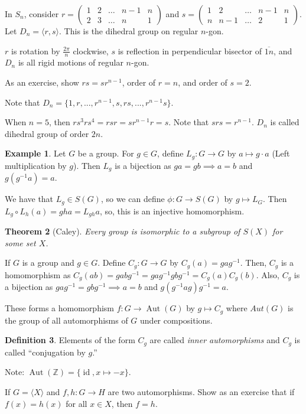 \documentclass{amsart}
\newtheorem{thm}{Theorem}[section]
\theoremstyle{definition}
\newtheorem{definition}[thm]{Definition}
\newtheorem{example}[thm]{Example}
\newcommand{\Z}{\mathbb Z}
\DeclareMathOperator{\id}{id}
\DeclareMathOperator{\Aut}{Aut}
\begin{document}
In $S_n$, consider $r=\begin{pmatrix}
	1&2&\dots&n-1&n\\
	2&3&\dots&n&1
\end{pmatrix}$ and $s=\begin{pmatrix}
	1&2&\dots&n-1&n\\
	n&n-1&\dots&2&1
\end{pmatrix}$. Let $D_n=\langle r,s\rangle$. This is the dihedral group on regular $n$-gon.

$r$ is rotation by $\frac{2\pi}{n}$ clockwise, $s$ is reflection in perpendicular bisector of $\overline{1n}$, and $D_n$ is all rigid motions of regular $n$-gon.

As an exercise, show $rs=sr^{n-1}$, order of $r=n$, and order of $s=2$.

Note that $D_n=\{1,r,...,r^{n-1},s,rs,...,r^{n-1}s\}$.

When $n=5$, then $rs^3rs^4=rsr=sr^{n-1}r=s$. Note that $srs=r^{n-1}$. $D_n$ is called dihedral group of order $2n$.

\begin{example}
	Let $G$ be a group. For $g\in G$, define $L_g:G\to G$ by $a\mapsto g\cdot a$ (Left multiplication by $g$). Then $L_g$ is a bijection as $ga=gb\implies a=b$ and $g(g^{-1}a)=a$.
	
	We have that $L_g\in S(G)$, so we can define $\phi:G\to S(G)$ by $g\mapsto L_G$. Then $L_g\circ L_h(a)=gha=L_{gh}a$, so, this is an injective homomorphism. 
\end{example}
\begin{thm}[Caley]
	Every group is isomorphic to a subgroup of $S(X)$ for some set $X$.
\end{thm}
If $G$ is a group and $g\in G$. Define $C_g:G\to G$ by $C_g(a)=gag^{-1}$. Then, $C_g$ is a homomorphism as $C_g(ab)=gabg^{-1}=gag^{-1}gbg^{-1}=C_g(a)C_g(b)$. Also, $C_g$ is a bijection as $gag^{-1}=gbg^{-1}\implies a=b$ and $g(g^{-1}ag)g^{-1}=a$.

These forms a homomorphism $f:G\to \Aut(G)$ by $g\mapsto C_g$ where $Aut(G)$ is the group of all automorphisms of $G$ under compositions.

\begin{definition}
	Elements of the form $C_g$ are called \emph{inner automorphisms} and $C_g$ is called ``conjugation by $g$.''
\end{definition}
Note: $\Aut(\Z)=\{\id,x\mapsto-x\}$.

If $G=\langle X\rangle$ and $f,h:G\to H$ are two automorphisms. Show as an exercise that if $f(x)=h(x)$ for all $x\in X$, then $f=h$.
\end{document}
